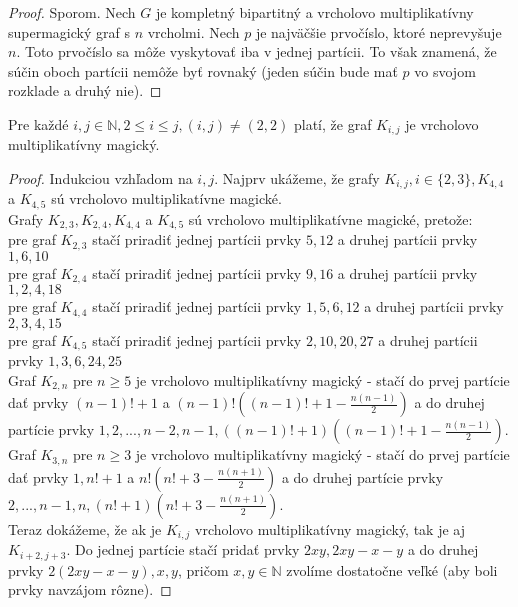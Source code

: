 \begin{proof} Sporom. Nech $G$ je kompletný bipartitný a vrcholovo multiplikatívny supermagický graf s $n$ vrcholmi. Nech $p$ je najväčšie prvočíslo, ktoré neprevyšuje $n$. Toto prvočíslo sa môže vyskytovať iba v jednej partícii. To však znamená, že súčin oboch partícii nemôže byť rovnaký (jeden súčin bude mať $p$ vo svojom rozklade a druhý nie).
\end{proof}

\begin{subtheorem} Pre každé $i,j \in \mathbb{N}, 2 \leq i \leq j, (i, j) \neq (2, 2)$ platí, že graf $K_{i,j}$ je vrcholovo multiplikatívny magický.
\end{subtheorem}

\begin{proof} Indukciou vzhľadom na $i,j$. Najprv ukážeme, že grafy $K_{i,j}, i \in \{2,3\}, K_{4,4}$ a $K_{4,5}$ sú vrcholovo multiplikatívne magické. \\

Grafy $K_{2,3}, K_{2,4}, K_{4,4}$ a $K_{4,5}$ sú vrcholovo multiplikatívne magické, pretože: \\
pre graf $K_{2,3}$ stačí priradiť jednej partícii prvky $5, 12$ a druhej partícii prvky $1, 6, 10$ \\
pre graf $K_{2,4}$ stačí priradiť jednej partícii prvky $9, 16$ a druhej partícii prvky $1, 2, 4, 18$ \\
pre graf $K_{4,4}$ stačí priradiť jednej partícii prvky $1, 5, 6, 12$ a druhej partícii prvky $2, 3, 4, 15$ \\
pre graf $K_{4,5}$ stačí priradiť jednej partícii prvky $2, 10, 20, 27$ a druhej partícii prvky $1, 3, 6, 24, 25$ \\

Graf $K_{2,n}$ pre $n \geq 5$ je vrcholovo multiplikatívny magický - stačí do prvej partície dať prvky $(n-1)! + 1$ a $(n-1)! ((n-1)! + 1 - \frac{n(n-1)}{2})$ a do druhej partície prvky $1, 2, ... , n-2, n-1, ((n-1)! + 1) ((n-1)! + 1 - \frac{n(n-1)}{2})$. \\

Graf $K_{3,n}$ pre $n \geq 3$ je vrcholovo multiplikatívny magický - stačí do prvej partície dať prvky $1, n! + 1$ a $n! (n! + 3 - \frac{n(n+1)}{2})$ a do druhej partície prvky $2, ... , n-1, n, (n! + 1) (n! + 3 - \frac{n(n+1)}{2})$. \\

Teraz dokážeme, že ak je $K_{i,j}$ vrcholovo multiplikatívny magický, tak je aj $K_{i+2,j+3}$. Do jednej partície stačí pridať prvky $2xy, 2xy - x - y$ a do druhej prvky $2(2xy - x - y), x, y$, pričom $x,y \in \mathbb{N}$ zvolíme dostatočne veľké (aby boli prvky navzájom rôzne).
\end{proof}



